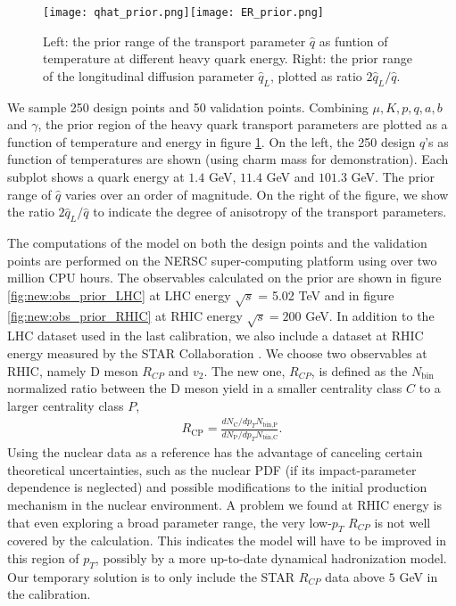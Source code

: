 \begin{figure}
\centering
\texttt{[image: qhat\_prior.png]}\texttt{[image: ER\_prior.png]}
\caption{Left: the prior range of the transport parameter $\hat{q}$ as funtion of temperature at different heavy quark energy. Right: the prior range of the longitudinal diffusion parameter $\hat{q}_L$, plotted as ratio $2\hat{q}_L/\hat{q}$.}
\label{fig:new:design-qhat}
\end{figure}

We sample 250 design points and 50 validation points. 
Combining $\mu, K, p, q, a, b$ and $\gamma$, the prior region of the heavy quark transport parameters are plotted as a function of temperature and energy in figure \ref{fig:new:design-qhat}. 
On the left, the 250 design $\hat{q}$'s as function of temperatures are shown  (using charm mass for demonstration).
Each subplot shows a quark energy at $1.4$ GeV, $11.4$ GeV and $101.3$ GeV.
The prior range of $\hat{q}$ varies over an order of magnitude.
On the right of the figure, we show the ratio $2\hat{q}_L/\hat{q}$ to indicate the degree of anisotropy of the transport parameters.

The computations of the model on both the design points and the validation points are performed on the NERSC super-computing platform using over two million CPU hours.
The observables calculated on the prior are shown in figure \ref{fig:new:obs_prior_LHC} at LHC energy $\sqrt{s}$ = 5.02 TeV and in figure \ref{fig:new:obs_prior_RHIC} at RHIC energy $\sqrt{s} = 200$ GeV.
In addition to the LHC dataset used in the last calibration, we also include a dataset at RHIC energy measured by the STAR Collaboration \cite{Adamczyk:2017xur,Adam:2018inb}.
We choose two observables at RHIC, namely D meson $R_{CP}$ and $v_2$. 
The new one, $R_{CP}$, is defined as the $N_{\textrm{bin}}$ normalized ratio between the D meson yield in a smaller centrality class $C$ to a larger centrality class $P$,
\begin{eqnarray}
R_{\textrm{CP}} = \frac{dN_\textrm{C}/dp_T N_{\textrm{bin,P}}}{dN_\textrm{P}/dp_T N_{\textrm{bin,C}}}.
\end{eqnarray}
Using the nuclear data as a reference has the advantage of canceling certain theoretical uncertainties, such as the nuclear PDF (if its impact-parameter dependence is neglected) and possible modifications to the initial production mechanism in the nuclear environment.
A problem we found at RHIC energy is that even exploring a broad parameter range, the very low-$p_T$ $R_{CP}$ is not well covered by the calculation. 
This indicates the model will have to be improved in this region of $p_T$, possibly by a more up-to-date dynamical hadronization model.
Our temporary solution is to only include the STAR $R_{CP}$ data above $5$ GeV in the calibration.

